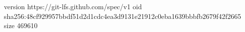 version https://git-lfs.github.com/spec/v1
oid sha256:48cf929957bbdf51d2d1cdc4ea3d9131e21912c0eba1639bbbfb2679f42f2665
size 469610
